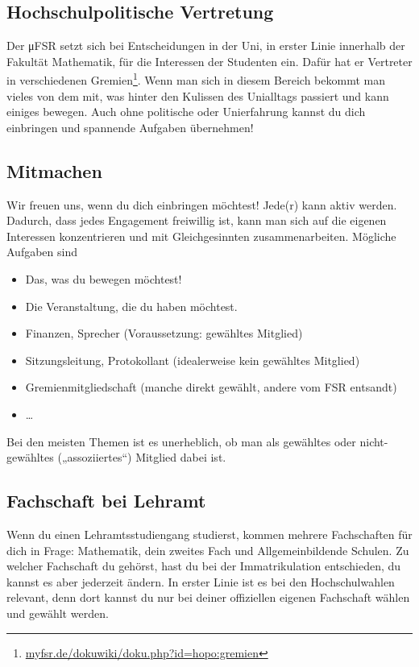 \documentclass{scrartcl}
\begin{document}
\subsection{Hochschulpolitische Vertretung}
\label{sub:hochschulpolitische_vertretung}
Der μFSR setzt sich bei Entscheidungen in der Uni, in erster Linie innerhalb der Fakultät Mathematik,
für die Interessen der Studenten ein.
Dafür hat er Vertreter in verschiedenen Gremien\footnote{\url{myfsr.de/dokuwiki/doku.php?id=hopo:gremien}}.
Wenn man sich in diesem Bereich  bekommt man vieles von dem mit, was hinter den Kulissen
des Unialltags passiert und kann einiges bewegen.
Auch ohne politische oder Unierfahrung kannst du dich einbringen und spannende Aufgaben übernehmen!

\subsection{Mitmachen}
\label{sub:mitmachen}
Wir freuen uns, wenn du dich einbringen möchtest! Jede(r) kann aktiv werden.
Dadurch, dass jedes Engagement freiwillig ist, kann man sich auf die eigenen Interessen konzentrieren
und mit Gleichgesinnten zusammenarbeiten. Mögliche Aufgaben sind
\begin{itemize}
  \item Das, was du bewegen möchtest!
  \item Die Veranstaltung, die du haben möchtest.
  \item Finanzen, Sprecher (Voraussetzung: gewähltes Mitglied)
  \item Sitzungsleitung, Protokollant (idealerweise kein gewähltes Mitglied)
  \item Gremienmitgliedschaft (manche direkt gewählt, andere vom FSR entsandt)
  \item \dots
\end{itemize}
Bei den meisten Themen ist es unerheblich, ob man als gewähltes oder nicht-gewähltes („assoziiertes“) Mitglied dabei ist.

\subsection{Fachschaft bei Lehramt}
\label{sub:fachschaft_bei_lehramt}
Wenn du einen Lehramtsstudiengang studierst, kommen mehrere Fachschaften für dich in Frage: Mathematik, dein zweites Fach und Allgemeinbildende Schulen.
Zu welcher Fachschaft du gehörst, hast du bei der Immatrikulation entschieden, du kannst es aber jederzeit ändern.
In erster Linie ist es bei den Hochschulwahlen relevant, denn dort kannst du nur bei deiner offiziellen
eigenen Fachschaft wählen und gewählt werden.
\end{document}
